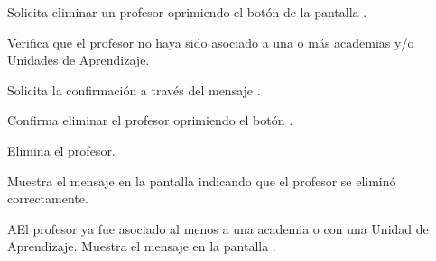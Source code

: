 \begin{UCtrayectoria}
	\UCpaso [\UCactor] Solicita eliminar un profesor oprimiendo el botón  
	de la pantalla .
	
	\UCpaso [\UCsist] Verifica que el profesor no haya sido asociado a una o más academias y/o Unidades de Aprendizaje. 
	
	\UCpaso [\UCsist] Solicita la confirmación a través del mensaje .
	
	\UCpaso [\UCactor] Confirma eliminar el profesor oprimiendo el botón .
	
	\UCpaso [\UCsist] Elimina el profesor.
	
	\UCpaso [\UCsist] Muestra el mensaje  en la pantalla  indicando que el profesor se eliminó correctamente.	
	
\end{UCtrayectoria}

\begin{UCtrayectoriaA}{A}{El profesor ya fue asociado al menos a una academia o con una Unidad de Aprendizaje.}
	\UCpaso [\UCsist] Muestra el mensaje  en la pantalla . 
\end{UCtrayectoriaA}
